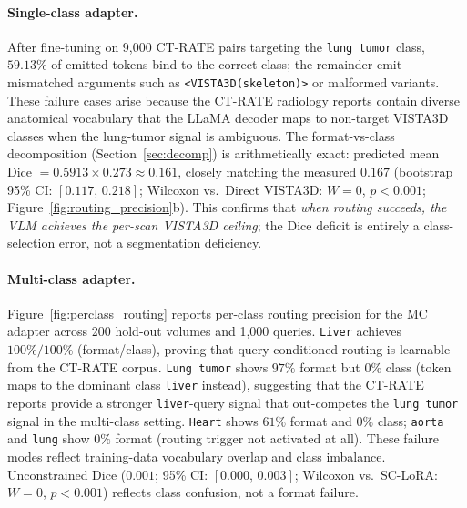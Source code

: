 \documentclass[lineno,referee,pdflatex,sn-mathphys-num]{sn-jnl}
\begin{document}
\paragraph{Single-class adapter.}
After fine-tuning on 9{,}000 CT-RATE pairs targeting the \texttt{lung tumor}
class, $59.13\%$ of emitted tokens bind to the correct class; the remainder
emit mismatched arguments such as \texttt{<VISTA3D(skeleton)>} or malformed
variants. These failure cases arise because the CT-RATE radiology reports
contain diverse anatomical vocabulary that the LLaMA decoder maps to
non-target VISTA3D classes when the lung-tumor signal is ambiguous.
The format-vs-class decomposition (Section~\ref{sec:decomp}) is
arithmetically exact: predicted mean Dice
$= 0.5913 \times 0.273 \approx 0.161$, closely matching the measured
$0.167$ (bootstrap 95\% CI: $[0.117,\,0.218]$; Wilcoxon vs.\ Direct
VISTA3D: $W\!=\!0$, $p<0.001$;
Figure~\ref{fig:routing_precision}b). This confirms that \emph{when
routing succeeds, the VLM achieves the per-scan VISTA3D ceiling}; the
Dice deficit is entirely a class-selection error, not a segmentation
deficiency.

\paragraph{Multi-class adapter.}
Figure~\ref{fig:perclass_routing} reports per-class routing precision
for the MC adapter across 200 hold-out volumes and 1{,}000 queries.
\texttt{Liver} achieves $100\%/100\%$ (format/class), proving that
query-conditioned routing is learnable from the CT-RATE corpus.
\texttt{Lung tumor} shows $97\%$ format but $0\%$ class (token maps to
the dominant class \texttt{liver} instead), suggesting that the
CT-RATE reports provide a stronger \texttt{liver}-query signal that
out-competes the \texttt{lung tumor} signal in the multi-class setting.
\texttt{Heart} shows $61\%$ format and $0\%$ class; \texttt{aorta} and
\texttt{lung} show $0\%$ format (routing trigger not activated at all).
These failure modes reflect training-data vocabulary overlap and class
imbalance. Unconstrained Dice ($0.001$; 95\% CI: $[0.000,\,0.003]$;
Wilcoxon vs.\ SC-LoRA: $W\!=\!0$, $p<0.001$) reflects class confusion,
not a format failure.
\end{document}
